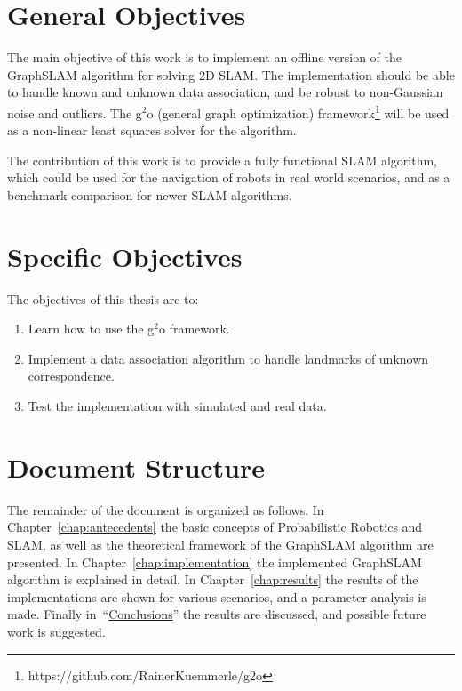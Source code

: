 \section{General Objectives}

The main objective of this work is to implement an offline version of the GraphSLAM algorithm for solving 2D SLAM. The implementation should be able to handle known and unknown data association, and be robust to non-Gaussian noise and outliers. The g$^2$o (general graph optimization) framework\footnote{https://github.com/RainerKuemmerle/g2o} will be used as a non-linear least squares solver for the algorithm.

The contribution of this work is to provide a fully functional SLAM algorithm, which could be used for the navigation of robots in real world scenarios, and as a benchmark comparison for newer SLAM algorithms.

\section{Specific Objectives}

The objectives of this thesis are to:

\begin{enumerate}
    \item Learn how to use the g$^2$o framework.
    \item Implement a data association algorithm to handle landmarks of unknown correspondence.
    \item Test the implementation with simulated and real data. 
\end{enumerate}

\section{Document Structure}

The remainder of the document is organized as follows. In Chapter~\ref{chap:antecedents} the basic concepts of Probabilistic Robotics and SLAM, as well as the theoretical framework of the GraphSLAM algorithm are presented. In Chapter~\ref{chap:implementation} the implemented GraphSLAM algorithm is explained in detail. In Chapter~\ref{chap:results} the results of the implementations are shown for various scenarios, and a parameter analysis is made. Finally in~``\hyperref[chap:conclusion]{Conclusions}'' the results are discussed, and possible future work is suggested. 
